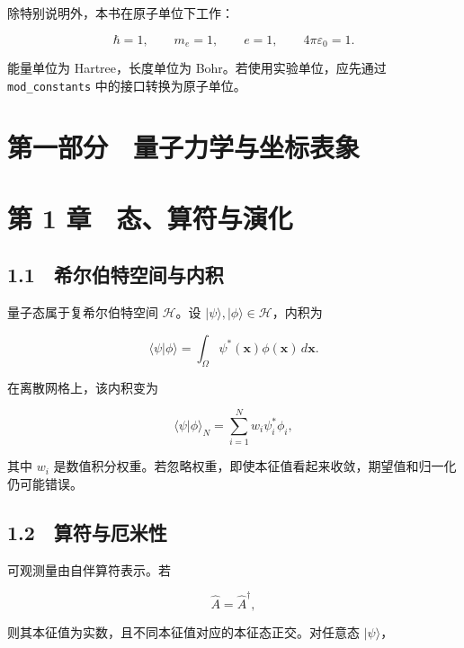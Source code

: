 \documentclass[
  a4paper,
]{ctexbook}
\begin{document}
除特别说明外，本书在原子单位下工作：

\[
\hbar=1,\qquad m_e=1,\qquad e=1,\qquad 4\pi\varepsilon_0=1.
\]

能量单位为 Hartree，长度单位为 Bohr。若使用实验单位，应先通过
\texttt{mod\_constants} 中的接口转换为原子单位。

\hypertarget{ux7b2cux4e00ux90e8ux5206-ux91cfux5b50ux529bux5b66ux4e0eux5750ux6807ux8868ux8c61}{%
\section{第一部分　量子力学与坐标表象}\label{ux7b2cux4e00ux90e8ux5206-ux91cfux5b50ux529bux5b66ux4e0eux5750ux6807ux8868ux8c61}}

\hypertarget{ux7b2c-1-ux7ae0-ux6001ux7b97ux7b26ux4e0eux6f14ux5316}{%
\section{第 1
章　态、算符与演化}\label{ux7b2c-1-ux7ae0-ux6001ux7b97ux7b26ux4e0eux6f14ux5316}}

\hypertarget{ux5e0cux5c14ux4f2fux7279ux7a7aux95f4ux4e0eux5185ux79ef}{%
\subsection{1.1　希尔伯特空间与内积}\label{ux5e0cux5c14ux4f2fux7279ux7a7aux95f4ux4e0eux5185ux79ef}}

量子态属于复希尔伯特空间 \(\mathcal{H}\)。设
\(|\psi\rangle,|\phi\rangle\in\mathcal{H}\)，内积为

\[
\langle \psi|\phi\rangle
=
\int_{\Omega}\psi^{*}(\mathbf{x})\phi(\mathbf{x})\,d\mathbf{x}.
\]

在离散网格上，该内积变为

\[
\langle \psi|\phi\rangle_N
=
\sum_{i=1}^{N}w_i\psi_i^{*}\phi_i,
\]

其中 \(w_i\)
是数值积分权重。若忽略权重，即使本征值看起来收敛，期望值和归一化仍可能错误。

\hypertarget{ux7b97ux7b26ux4e0eux5384ux7c73ux6027}{%
\subsection{1.2　算符与厄米性}\label{ux7b97ux7b26ux4e0eux5384ux7c73ux6027}}

可观测量由自伴算符表示。若

\[
\hat A=\hat A^{\dagger},
\]

则其本征值为实数，且不同本征值对应的本征态正交。对任意态
\(|\psi\rangle\)，
\end{document}
